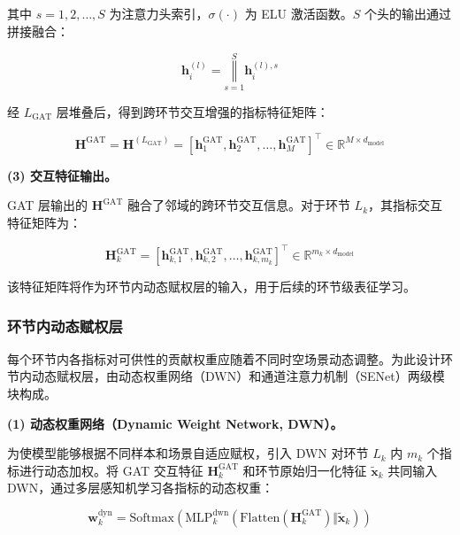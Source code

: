 其中 $s=1,2,\ldots,S$ 为注意力头索引，$\sigma(\cdot)$ 为 ELU 激活函数。$S$ 个头的输出通过拼接融合：

\begin{equation}
\mathbf{h}_i^{(l)} = \mathop{\Vert}\limits_{s=1}^{S} \mathbf{h}_i^{(l),s}
\end{equation}

经 $L_{\text{GAT}}$ 层堆叠后，得到跨环节交互增强的指标特征矩阵：

\begin{equation}
\mathbf{H}^{\text{GAT}} = \mathbf{H}^{(L_{\text{GAT}})} = [\mathbf{h}_1^{\text{GAT}},\mathbf{h}_2^{\text{GAT}},\ldots,\mathbf{h}_M^{\text{GAT}}]^{\top} \in \mathbb{R}^{M\times d_{\text{model}}}
\end{equation}

\textbf{(3) 交互特征输出。}

GAT 层输出的 $\mathbf{H}^{\text{GAT}}$ 融合了邻域的跨环节交互信息。对于环节 $L_k$，其指标交互特征矩阵为：

\begin{equation}
\mathbf{H}_k^{\text{GAT}} = [\mathbf{h}_{k,1}^{\text{GAT}},\mathbf{h}_{k,2}^{\text{GAT}},\ldots,\mathbf{h}_{k,m_k}^{\text{GAT}}]^{\top} \in \mathbb{R}^{m_k\times d_{\text{model}}}
\end{equation}

该特征矩阵将作为环节内动态赋权层的输入，用于后续的环节级表征学习。

\subsubsection{环节内动态赋权层}

每个环节内各指标对可供性的贡献权重应随着不同时空场景动态调整。为此设计环节内动态赋权层，由动态权重网络（DWN）和通道注意力机制（SENet）两级模块构成。

\textbf{(1) 动态权重网络（Dynamic Weight Network, DWN）。}

为使模型能够根据不同样本和场景自适应赋权，引入 DWN 对环节 $L_k$ 内 $m_k$ 个指标进行动态加权。将 GAT 交互特征 $\mathbf{H}_k^{\text{GAT}}$ 和环节原始归一化特征 $\tilde{\mathbf{x}}_k$ 共同输入 DWN，通过多层感知机学习各指标的动态权重：

\begin{equation}
\mathbf{w}_k^{\text{dyn}} = \text{Softmax}\left(\text{MLP}_k^{\text{dwn}}\left(\text{Flatten}\left(\mathbf{H}_k^{\text{GAT}}\right) \Vert \tilde{\mathbf{x}}_k\right)\right)
\end{equation}

